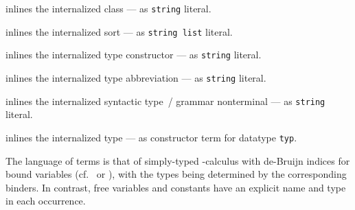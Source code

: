 \begin{isabellebody}
\begin{isamarkuptext}
  \begin{description}

  \item {} inlines the internalized class  --- as \verb|string| literal.

  \item {} inlines the internalized sort 
  --- as \verb|string list| literal.

  \item {} inlines the internalized type
  constructor  --- as \verb|string| literal.

  \item {} inlines the internalized type
  abbreviation  --- as \verb|string| literal.

  \item {} inlines the internalized syntactic
  type~/ grammar nonterminal  --- as \verb|string|
  literal.

  \item {} inlines the internalized type 
  --- as constructor term for datatype \verb|typ|.

  \end{description}%
\end{isamarkuptext}%
\isamarkuptrue%
%
\endisatagmlantiq
{\isafoldmlantiq}%
%
\isadelimmlantiq
%
\endisadelimmlantiq
%
\isamarkuptrue%
%
\begin{isamarkuptext}%
The language of terms is that of simply-typed -calculus
  with de-Bruijn indices for bound variables (cf.\ \cite{debruijn72}
  or \cite{paulson-ml2}), with the types being determined by the
  corresponding binders.  In contrast, free variables and constants
  have an explicit name and type in each occurrence.


\end{isamarkuptext}
\end{isabellebody}
